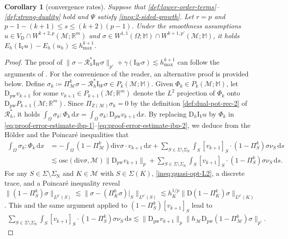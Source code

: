 \documentclass[a4paper]{amsart}
\numberwithin{equation}{section}
\newcommand{\R}{\mathbb{R}}
\renewcommand{\d}[1]{\,\mathrm{d}#1}
\renewcommand{\div}{\mathrm{div}}
\newcommand{\I}{\mathrm{I}}
\newcommand{\Mcal}{\mathcal{M}}
\newcommand{\pw}{\mathrm{pw}}
\newcommand{\D}{\mathrm{D}}
\newcommand{\M}{\mathbb{M}}
\newcommand{\osc}{\mathrm{osc}}
\newtheorem{corollary}[theorem]{Corollary}
\theoremstyle{remark}
\begin{document}
\begin{corollary}[convergence rates]\label{cor:convergence-rates}
	Suppose that \eqref{def:lower-order-terms}--\eqref{def:strong-duality} hold and $\Psi$ satisfy \eqref{ineq:2-sided-growth}.
	Let $r = p$ and $p-1-(k+1) \leq s \leq (k+2)(p-1)$.
	Under the smoothness assumptions $u \in V_\mathrm{D} \cap W^{k+2,p}(\Mcal;\R^m)$ and $\sigma \in W^{1,1}(\Omega;\M) \cap W^{k+1,p'}(\Mcal;\M)$, it holds $E_h(\I_V u) - E_h(u_h) \lesssim h_{\max}^{k+1}$.
\end{corollary}
\begin{proof}
	The proof of $\|\sigma - \mathcal{R}_h^* \I_W \sigma\|_{p'} + \gamma(\I_W \sigma) \lesssim h_{\max}^{k+1}$ can follow the arguments of \cite[Section 6]{DiPietroDroniou2023}. For the convenience of the reader, an alternative proof is provided below. Define $\sigma_k \coloneqq \Pi_\Mcal^k \sigma - \mathcal{R}^*_h \I_W \sigma \in P_k(\Mcal;\M)$.
	Given $\Phi_k \in P_k(\Mcal; \M)$, let $\D_\pw v_{k+1}$ for some $v_{k+1} \in P_{k+1}(\Mcal;\R^m)$ denote the $L^2$ projection of $\Phi_k$ onto $\D_\pw P_{k+1}(\Mcal;\R^m)$.
	Since $\Pi_{Z(\Mcal)} \sigma_k = 0$ by the definition \eqref{def:dual-pot-rec-2} of $\mathcal{R}_h^*$, it holds
	$\int_\Omega \sigma_k : \Phi_k \d{x} = \int_\Omega \sigma_k : \D_\pw v_{k+1} \d{x}$.
	By replacing $\D_h \I_V u$ by $\Phi_{k}$ in \eqref{eq:proof-error-estimate-ibp-1}--\eqref{eq:proof-error-estimate-ibp-2},
	we deduce from the H\"older and the Poincar\'e inequalities that
	\begin{align*}
		\int_\Omega \sigma_k : \Phi_k \d{x} &= - \int_\Omega (1 - \Pi_\Mcal^k) \div \sigma \cdot v_{k+1} \d{x}
		+ \sum_{S \in \Sigma \setminus \Sigma_\mathrm{N}} \int_S [v_{k+1}]_S \cdot (1 - \Pi_S^k) \sigma \nu_S \d{s}\nonumber\\
		&\lesssim \osc(\div \sigma,\Mcal)\|\D_\pw v_{k+1}\|_{p} + \sum_{S \in \Sigma \setminus \Sigma_\mathrm{N}} \int_S [v_{k+1}]_S \cdot (1 - \Pi_S^k) \sigma \nu_S \d{s}.
	\end{align*}
	For any $S \in \Sigma \setminus \Sigma_\mathrm{N}$ and $K \in \Mcal$ with $S \in \Sigma(K)$, \eqref{ineq:quasi-opt-L2}, a discrete trace, and a Poincar\'e inequality reveal $\|(1 - \Pi_S^k) \sigma\|_{L^{p'}(S)} \lesssim \|\sigma - (\Pi_K^k \sigma)|_S\|_{L^{p'}(S)} \lesssim h_K^{1/p}\|\D(1 - \Pi_K^k) \sigma\|_{L^{p'}(K)}$.
	This and the same argument applied to $(1 - \Pi_S^k)[v_{k+1}]_S$ lead to
	\begin{align*}
		\sum_{S \in \Sigma \setminus \Sigma_\mathrm{N}} \int_S [v_{k+1}]_S \cdot (1 - \Pi_S^k) \sigma \nu_S \d{s} \lesssim \|\D_\pw v_{k+1}\|_p\|h_\Mcal\D_\pw(1 - \Pi_\Mcal^k) \sigma\|_{p'}.

\end{align*}
\end{proof}
\end{document}
